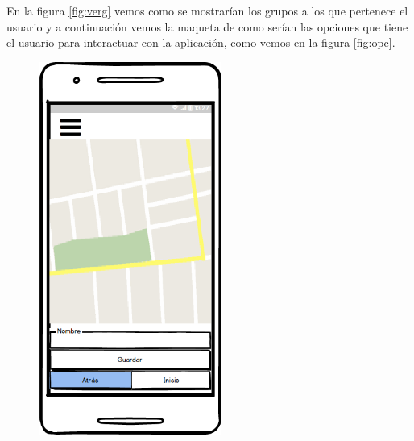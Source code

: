 En la figura \ref{fig:verg} vemos como se mostrarían los grupos a los que pertenece el usuario y a continuación vemos la maqueta de como serían las opciones que tiene el usuario para interactuar con la aplicación, como vemos en la figura  \ref{fig:opc}.













	\begin{figure}[H]
\begin{minipage}[b]{0.5\linewidth} %
\centering
\includegraphics[width=6cm]{maqueta/pdi1.png}
 

\end{minipage}
\end{figure}
